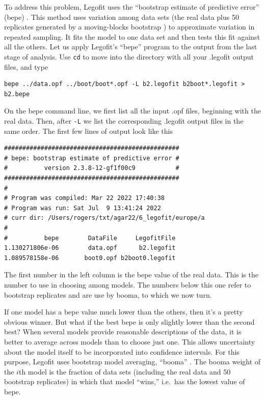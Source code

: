 \documentclass[11pt]{article}
\begin{document}
To address this problem, Legofit uses the ``bootstrap estimate of
predictive error'' (bepe)
\citep{Rogers:BMC-20-526,Efron:JAS-78-316,Efron:IB-93}. This method
uses variation among data sets (the real data plus 50 replicates
generated by a moving-blocks bootstrap \citep{Liu:ELB-92-225}) to
approximate variation in repeated sampling. It fits the model to one
data set and then tests this fit against all the others. Let us apply
Legofit's ``bepe'' program to the output from the last stage of
analysis. Use \texttt{cd} to move into the directory with all your
.legofit output files, and type
\begin{verbatim}
bepe ../data.opf ../boot/boot*.opf -L b2.legofit b2boot*.legofit > b2.bepe
\end{verbatim}
On the bepe command line, we first list all the input .opf files,
beginning with the real data. Then, after \texttt{-L} we list the
corresponding .legofit output files in the same order. The first few
lines of output look like this
\begin{verbatim}
################################################
# bepe: bootstrap estimate of predictive error #
#          version 2.3.8-12-gf1f00c9           #
################################################
#
# Program was compiled: Mar 22 2022 17:40:38
# Program was run: Sat Jul  9 13:41:24 2022
# curr dir: /Users/rogers/txt/agar22/6_legofit/europe/a
#
#          bepe        DataFile     LegofitFile
1.130271806e-06        data.opf      b2.legofit
1.089578158e-06       boot0.opf b2boot0.legofit
\end{verbatim}
The first number in the left column is the bepe value of the real
data. This is the number to use in choosing among models. The numbers
below this one refer to bootstrap replicates and are use by booma,
to which we now turn.

If one model has a bepe value much lower than the others, then it's a
pretty obvious winner. But what if the best bepe is only slightly
lower than the second best? When several models provide reasonable
descriptions of the data, it is better to average across models than
to choose just one. This allows uncertainty about the model itself to
be incorporated into confidence intervals. For this purpose, Legofit
uses bootstrap model averaging, ``booma''
\citep{Buckland:B-53-603,Rogers:BMC-20-526}. The booma weight of the
$i$th model is the fraction of data sets (including the real data and
50 bootstrap replicates) in which that model ``wins,'' i.e.\ has the
lowest value of bepe.
\end{document}
